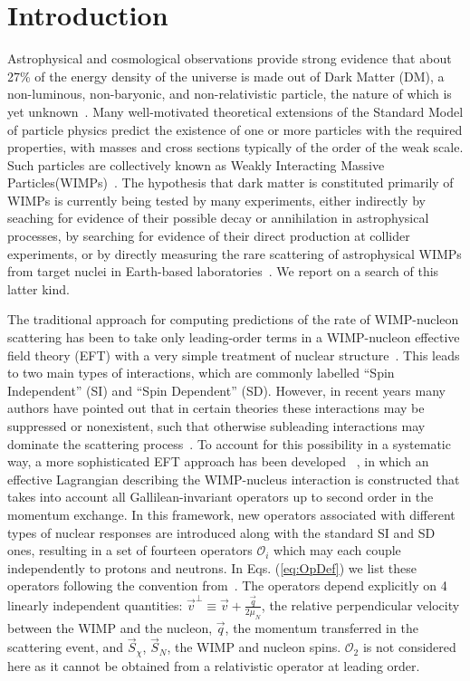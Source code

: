 \section{Introduction}

Astrophysical and cosmological observations provide strong evidence that about 27\% of the energy density of the universe is made out of Dark Matter (DM), a non-luminous, non-baryonic, and non-relativistic particle, the nature of which is yet unknown~\cite{Harvey1462,WMAP:9years,PLANCK}. Many well-motivated theoretical extensions of the Standard Model of particle physics predict the existence of one or more particles with the required properties, with masses and cross sections typically of the order of the weak scale. Such particles are collectively known as Weakly Interacting Massive Particles(WIMPs)~\cite{Bertone:2010zza}. The hypothesis that dark matter is constituted primarily of WIMPs is currently being tested by many experiments, either indirectly by seaching for evidence of their possible decay or annihilation in astrophysical processes, by searching for evidence of their direct production at collider experiments, or by directly measuring the rare scattering of astrophysical WIMPs from target nuclei in Earth-based laboratories~\cite{xe100_run_combination,PANDAX,LUXnew,COGENT,CDMSlite,CREST,DAMA}. We report on a search of this latter kind.


The traditional approach for computing predictions of the rate of WIMP-nucleon scattering has been to take only leading-order terms in a WIMP-nucleon effective field theory (EFT) with a very simple treatment of nuclear structure~\cite{LEWIN}. This leads to two main types of interactions, which are commonly labelled ``Spin Independent'' (SI) and ``Spin Dependent'' (SD). However, in recent years many authors have pointed out that in certain theories these interactions may be suppressed or nonexistent, such that otherwise subleading interactions may dominate the scattering process~\cite{Chang:2009yt}. To account for this possibility in a systematic way, a more sophisticated EFT approach has been developed ~\cite{Fitzpatrick:2012ib,Anand:MathTools,Fitzpatrick:MathTools}, in which an effective Lagrangian describing the WIMP-nucleus interaction is constructed that takes into account all Gallilean-invariant operators up to second order in the momentum exchange. In this framework, new operators associated with different types of nuclear responses are introduced along with the standard SI and SD ones, resulting in a set of fourteen operators $\mathcal{O}_i$ which may each couple independently to protons and neutrons. In Eqs. (\ref{eq:OpDef}) we list these operators following the convention from~\cite{Anand:MathTools}. The operators depend explicitly on 4 linearly independent quantities: $\vec{v}^{\perp} \equiv \vec{v} + \frac{\vec{q}}{2\mu_N} $, the relative perpendicular velocity between the WIMP and the nucleon, $\vec{q}$, the momentum transferred in the scattering event, and $\vec{S}_\chi$, $\vec{S}_N$, the WIMP and nucleon spins. $\mathcal{O}_2$ is not considered here as it cannot be obtained from a relativistic operator at leading order.
%

